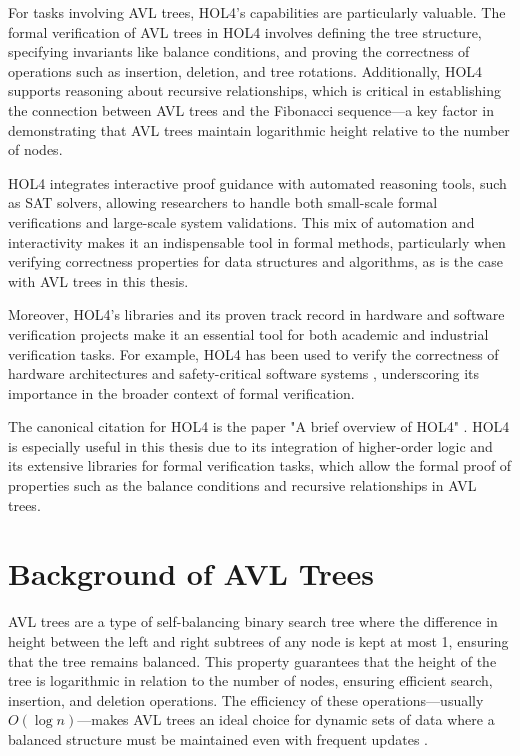 \documentclass[12pt]{article}
\begin{document}
For tasks involving AVL trees, HOL4’s capabilities are particularly valuable. The formal verification of AVL trees in HOL4 involves defining the tree structure, specifying invariants like balance conditions, and proving the correctness of operations such as insertion, deletion, and tree rotations. Additionally, HOL4 supports reasoning about recursive relationships, which is critical in establishing the connection between AVL trees and the Fibonacci sequence—a key factor in demonstrating that AVL trees maintain logarithmic height relative to the number of nodes.

HOL4 integrates interactive proof guidance with automated reasoning tools, such as SAT solvers, allowing researchers to handle both small-scale formal verifications and large-scale system validations. This mix of automation and interactivity makes it an indispensable tool in formal methods, particularly when verifying correctness properties for data structures and algorithms, as is the case with AVL trees in this thesis.

Moreover, HOL4's libraries and its proven track record in hardware and software verification projects make it an essential tool for both academic and industrial verification tasks. For example, HOL4 has been used to verify the correctness of hardware architectures and safety-critical software systems \cite{avigad2014formally}, underscoring its importance in the broader context of formal verification.

The canonical citation for HOL4 is the paper "A brief overview of HOL4" \cite{gordon2008hol4}. HOL4 is especially useful in this thesis due to its integration of higher-order logic and its extensive libraries for formal verification tasks, which allow the formal proof of properties such as the balance conditions and recursive relationships in AVL trees.

\section{Background of AVL Trees}


AVL trees are a type of self-balancing binary search tree where the difference in height between the left and right subtrees of any node is kept at most 1, ensuring that the tree remains balanced. This property guarantees that the height of the tree is logarithmic in relation to the number of nodes, ensuring efficient search, insertion, and deletion operations. The efficiency of these operations—usually $O(\log n)$—makes AVL trees an ideal choice for dynamic sets of data where a balanced structure must be maintained even with frequent updates \cite{cormen2009introduction}.
\end{document}
